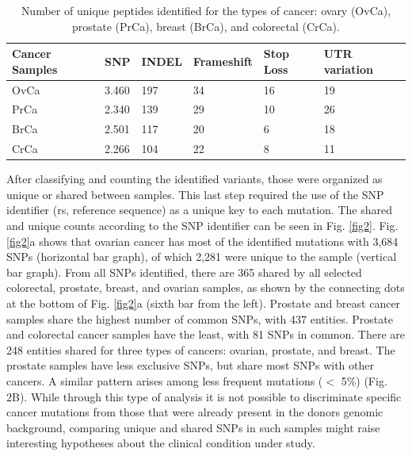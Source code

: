 \documentclass{ieeeaccess}
\begin{document}
\begin{table}
\caption{Number of unique peptides identified for the types of cancer: ovary (OvCa), prostate (PrCa), breast (BrCa), and colorectal (CrCa).}
\label{table}
\setlength{\tabcolsep}{3pt}
\begin{tabular}{|l|l|l|l|l|l|}
\hline
\textbf{Cancer Samples} & \textbf{SNP} &  \textbf{INDEL} & \textbf{Frameshift} &  \textbf{Stop Loss} & \textbf{UTR variation} \\ \hline
OvCa & 3.460 & 197 & 34 & 16 &  19\\
PrCa & 2.340 & 139 & 29 & 10 & 26 \\
BrCa & 2.501 & 117 & 20 & 6 & 18\\
CrCa & 2.266 & 104 & 22 & 8 & 11 \\
\hline
\end{tabular}
\label{tab1}
\end{table}

After classifying and counting the identified variants, those were organized as unique or shared between samples. This last step required the use of the SNP identifier (rs, reference sequence) as a unique key to each mutation. The shared and unique counts according to the SNP identifier can be seen in Fig. \ref{fig2}. Fig. \ref{fig2}a shows that ovarian cancer has most of the identified mutations with 3,684 SNPs (horizontal bar graph), of which 2,281 were unique to the sample (vertical bar graph). From all SNPs identified, there are 365 shared by all selected colorectal, prostate, breast, and ovarian samples, as shown by the connecting dots at the bottom of Fig. \ref{fig2}a (sixth bar from the left). Prostate and breast cancer samples share the highest number of common SNPs, with 437 entities. Prostate and colorectal cancer samples have the least, with 81 SNPs in common. There are 248 entities shared for three types of cancers: ovarian, prostate, and breast. The prostate samples have less exclusive SNPs, but share most SNPs with other cancers. A similar pattern arises among less frequent mutations ($<$ 5\%) (Fig. 2B). While through this type of analysis it is not possible to discriminate specific cancer mutations from those that were already present in the donors genomic background, comparing unique and shared SNPs in such samples might raise interesting hypotheses about the clinical condition under study.
\end{document}
